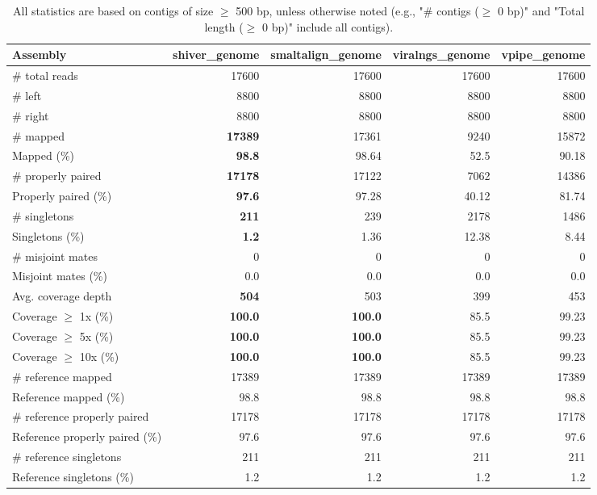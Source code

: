 \documentclass[12pt,a4paper]{article}
\begin{document}
\begin{table}[ht]
\begin{center}
\caption{All statistics are based on contigs of size $\geq$ 500 bp, unless otherwise noted (e.g., "\# contigs ($\geq$ 0 bp)" and "Total length ($\geq$ 0 bp)" include all contigs).}
\begin{tabular}{|l*{4}{|r}|}
\hline
Assembly & shiver\_genome & smaltalign\_genome & viralngs\_genome & vpipe\_genome \\ \hline
\# total reads & 17600 & 17600 & 17600 & 17600 \\ \hline
\# left & 8800 & 8800 & 8800 & 8800 \\ \hline
\# right & 8800 & 8800 & 8800 & 8800 \\ \hline
\# mapped & {\bf 17389} & 17361 & 9240 & 15872 \\ \hline
Mapped (\%) & {\bf 98.8} & 98.64 & 52.5 & 90.18 \\ \hline
\# properly paired & {\bf 17178} & 17122 & 7062 & 14386 \\ \hline
Properly paired (\%) & {\bf 97.6} & 97.28 & 40.12 & 81.74 \\ \hline
\# singletons & {\bf 211} & 239 & 2178 & 1486 \\ \hline
Singletons (\%) & {\bf 1.2} & 1.36 & 12.38 & 8.44 \\ \hline
\# misjoint mates & 0 & 0 & 0 & 0 \\ \hline
Misjoint mates (\%) & 0.0 & 0.0 & 0.0 & 0.0 \\ \hline
Avg. coverage depth & {\bf 504} & 503 & 399 & 453 \\ \hline
Coverage $\geq$ 1x (\%) & {\bf 100.0} & {\bf 100.0} & 85.5 & 99.23 \\ \hline
Coverage $\geq$ 5x (\%) & {\bf 100.0} & {\bf 100.0} & 85.5 & 99.23 \\ \hline
Coverage $\geq$ 10x (\%) & {\bf 100.0} & {\bf 100.0} & 85.5 & 99.23 \\ \hline
\# reference mapped & 17389 & 17389 & 17389 & 17389 \\ \hline
Reference mapped (\%) & 98.8 & 98.8 & 98.8 & 98.8 \\ \hline
\# reference properly paired & 17178 & 17178 & 17178 & 17178 \\ \hline
Reference properly paired (\%) & 97.6 & 97.6 & 97.6 & 97.6 \\ \hline
\# reference singletons & 211 & 211 & 211 & 211 \\ \hline
Reference singletons (\%) & 1.2 & 1.2 & 1.2 & 1.2 \\ \hline

\end{tabular}
\end{center}
\end{table}
\end{document}
